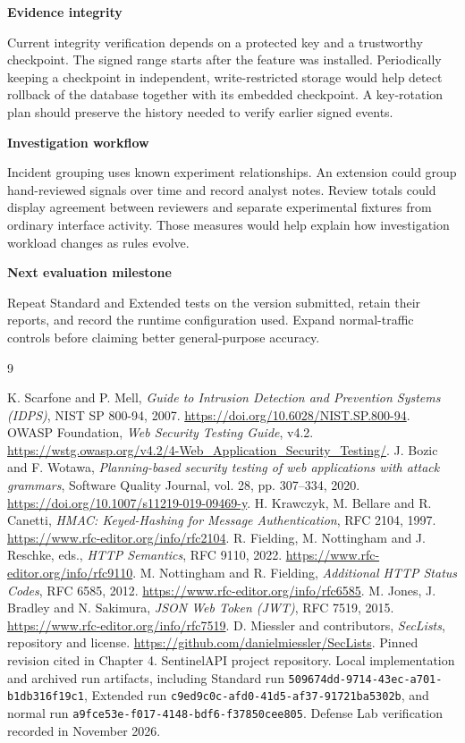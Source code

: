 \documentclass[11pt,letterpaper,oneside]{report}
\newcommand{\topic}[1]{\smallskip\noindent\textbf{#1}\par\nobreak\vspace{-.39em}}
\begin{document}
\topic{Evidence integrity}
Current integrity verification depends on a protected key and a trustworthy checkpoint. The signed range starts after the feature was installed. Periodically keeping a checkpoint in independent, write-restricted storage would help detect rollback of the database together with its embedded checkpoint. A key-rotation plan should preserve the history needed to verify earlier signed events.

\topic{Investigation workflow}
Incident grouping uses known experiment relationships. An extension could group hand-reviewed signals over time and record analyst notes. Review totals could display agreement between reviewers and separate experimental fixtures from ordinary interface activity. Those measures would help explain how investigation workload changes as rules evolve.

\topic{Next evaluation milestone}
Repeat Standard and Extended tests on the version submitted, retain their reports, and record the runtime configuration used. Expand normal-traffic controls before claiming better general-purpose accuracy.

\renewcommand{\bibname}{References}
\begin{thebibliography}{9}
\small
\setlength{\itemsep}{.5em}
 K. Scarfone and P. Mell, \emph{Guide to Intrusion Detection and Prevention Systems (IDPS)}, NIST SP 800-94, 2007. \url{https://doi.org/10.6028/NIST.SP.800-94}.
 OWASP Foundation, \emph{Web Security Testing Guide}, v4.2. \url{https://wstg.owasp.org/v4.2/4-Web_Application_Security_Testing/}.
 J. Bozic and F. Wotawa, \emph{Planning-based security testing of web applications with attack grammars}, Software Quality Journal, vol. 28, pp. 307--334, 2020. \url{https://doi.org/10.1007/s11219-019-09469-y}.
 H. Krawczyk, M. Bellare and R. Canetti, \emph{HMAC: Keyed-Hashing for Message Authentication}, RFC 2104, 1997. \url{https://www.rfc-editor.org/info/rfc2104}.
 R. Fielding, M. Nottingham and J. Reschke, eds., \emph{HTTP Semantics}, RFC 9110, 2022. \url{https://www.rfc-editor.org/info/rfc9110}.
 M. Nottingham and R. Fielding, \emph{Additional HTTP Status Codes}, RFC 6585, 2012. \url{https://www.rfc-editor.org/info/rfc6585}.
 M. Jones, J. Bradley and N. Sakimura, \emph{JSON Web Token (JWT)}, RFC 7519, 2015. \url{https://www.rfc-editor.org/info/rfc7519}.
 D. Miessler and contributors, \emph{SecLists}, repository and license. \url{https://github.com/danielmiessler/SecLists}. Pinned revision cited in Chapter 4.
 SentinelAPI project repository. Local implementation and archived run artifacts, including Standard run \nolinkurl{509674dd-9714-43ec-a701-b1db316f19c1}, Extended run \nolinkurl{c9ed9c0c-afd0-41d5-af37-91721ba5302b}, and normal run \nolinkurl{a9fce53e-f017-4148-bdf6-f37850cee805}. Defense Lab verification recorded in November 2026.
\end{thebibliography}
\end{document}
